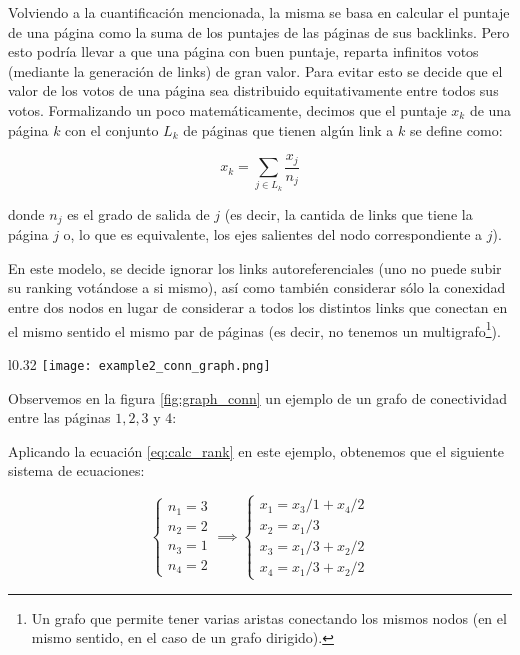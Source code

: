 \par Volviendo a la cuantificaci\'on mencionada, la misma se basa en calcular el
puntaje de una p\'agina como la suma de los puntajes de las p\'aginas de sus
backlinks. Pero esto podr\'ia llevar a que una p\'agina con buen puntaje,
reparta infinitos votos (mediante la generaci\'on de links) de gran valor. Para
evitar esto se decide que el valor de los votos de una p\'agina sea distribuido
equitativamente entre todos sus votos. Formalizando un poco matem\'aticamente,
decimos que el puntaje $x_k$ de una p\'agina $k$ con el conjunto $L_k$ de
p\'aginas que tienen alg\'un link a $k$ se define como:

\begin{equation}\label{eq:calc_rank}
    x_k = \sum_{j\in L_k} \dfrac{x_j}{n_j} 
\end{equation}

donde $n_j$ es el grado de salida de $j$ (es decir, la cantida de links que
tiene la p\'agina $j$ o, lo que es equivalente, los ejes salientes del nodo
correspondiente a $j$).

\par En este modelo, se decide ignorar los links autoreferenciales (uno no puede
subir su ranking vot\'andose a si mismo), as\'i como tambi\'en considerar s\'olo
la conexidad entre dos nodos en lugar de considerar a todos los distintos links
que conectan en el mismo sentido el mismo par de p\'aginas (es decir, no
tenemos un multigrafo\footnote{Un grafo que permite tener varias aristas
conectando los mismos nodos (en el mismo sentido, en el caso de un grafo
dirigido).}).

\begin{wrapfigure}[12]{l}{0.32\textwidth}
    \texttt{[image: example2\_conn\_graph.png]}
    \caption{Grafo de Conectividad~\cite{Bryan2006}}
    \label{fig:graph_conn}
\end{wrapfigure}
\noindent

\par Observemos en la figura \ref{fig:graph_conn} un ejemplo de un grafo de
conectividad entre las p\'aginas $1, 2, 3$ y $4$:

\par Aplicando la ecuaci\'on \ref{eq:calc_rank} en este ejemplo, obtenemos que
el siguiente sistema de ecuaciones:

\begin{equation}
    \begin{cases}
        n_1 = 3\\
        n_2 = 2\\
        n_3 = 1\\
        n_4 = 2
    \end{cases}
    \implies
    \begin{cases}
        x_1 = x_3/1 + x_4/2\\
        x_2 = x_1/3\\
        x_3 = x_1/3 + x_2/2\\
        x_4 = x_1/3 + x_2/2
    \end{cases}
\end{equation}

